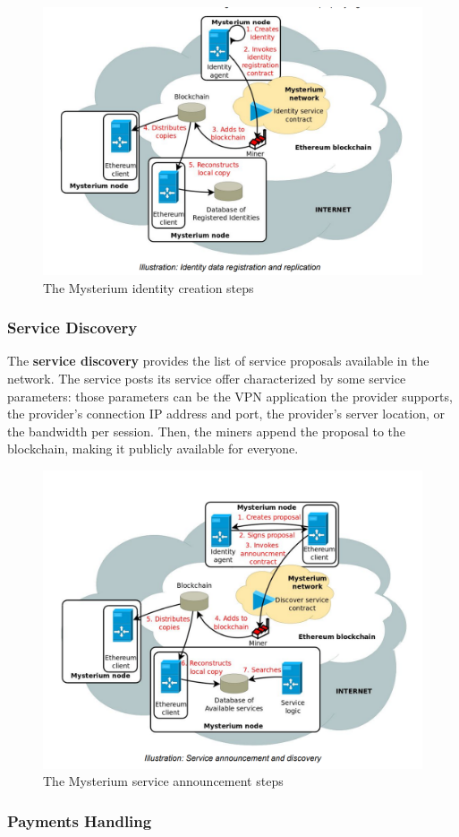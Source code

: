 \documentclass[]{article}
\begin{document}
	\begin{figure}
		\includegraphics[width=0.5\linewidth]{"images/mysterium_identity_creation.png"}
		\caption{The Mysterium identity creation steps}
	\end{figure}

	\subsubsection{Service Discovery}

	The \textbf{service discovery} provides the list of service proposals available in the network. The service posts its service offer characterized by some service parameters: those parameters can be the VPN application the provider supports, the provider's connection IP address and port, the provider's server location, or the bandwidth per session. Then, the miners append the proposal to the blockchain, making it publicly available for everyone.\\

	\begin{figure}
		\includegraphics[width=0.5\linewidth]{"images/mysterium_service_announcement.png"}
		\caption{The Mysterium service announcement steps}
	\end{figure}
	
	\subsubsection{Payments Handling}
\end{document}
